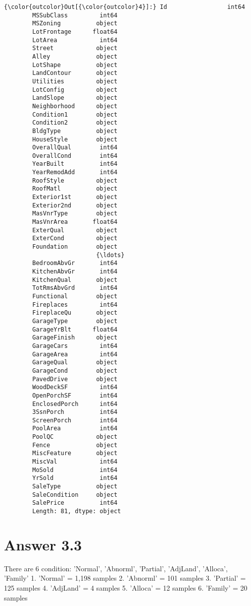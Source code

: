 \documentclass[11pt]{article}
\begin{document}
\begin{Verbatim}[commandchars=\\\{\}]
{\color{outcolor}Out[{\color{outcolor}4}]:} Id                 int64
        MSSubClass         int64
        MSZoning          object
        LotFrontage      float64
        LotArea            int64
        Street            object
        Alley             object
        LotShape          object
        LandContour       object
        Utilities         object
        LotConfig         object
        LandSlope         object
        Neighborhood      object
        Condition1        object
        Condition2        object
        BldgType          object
        HouseStyle        object
        OverallQual        int64
        OverallCond        int64
        YearBuilt          int64
        YearRemodAdd       int64
        RoofStyle         object
        RoofMatl          object
        Exterior1st       object
        Exterior2nd       object
        MasVnrType        object
        MasVnrArea       float64
        ExterQual         object
        ExterCond         object
        Foundation        object
                          {\ldots}   
        BedroomAbvGr       int64
        KitchenAbvGr       int64
        KitchenQual       object
        TotRmsAbvGrd       int64
        Functional        object
        Fireplaces         int64
        FireplaceQu       object
        GarageType        object
        GarageYrBlt      float64
        GarageFinish      object
        GarageCars         int64
        GarageArea         int64
        GarageQual        object
        GarageCond        object
        PavedDrive        object
        WoodDeckSF         int64
        OpenPorchSF        int64
        EnclosedPorch      int64
        3SsnPorch          int64
        ScreenPorch        int64
        PoolArea           int64
        PoolQC            object
        Fence             object
        MiscFeature       object
        MiscVal            int64
        MoSold             int64
        YrSold             int64
        SaleType          object
        SaleCondition     object
        SalePrice          int64
        Length: 81, dtype: object
\end{Verbatim}
            
    \section{Answer 3.3}\label{answer-3.3}

There are 6 condition: 'Normal', 'Abnorml', 'Partial', 'AdjLand',
'Alloca', 'Family' 1. 'Normal' = 1,198 samples 2. 'Abnorml' = 101
samples 3. 'Partial' = 125 samples 4. 'AdjLand' = 4 samples 5. 'Alloca'
= 12 samples 6. 'Family' = 20 samples
\end{document}
